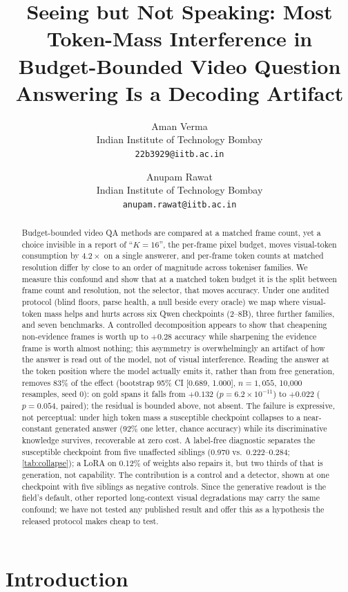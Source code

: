 \documentclass[10pt,twocolumn,letterpaper]{article}
\title{Seeing but Not Speaking: Most Token-Mass Interference in Budget-Bounded Video Question Answering Is a Decoding Artifact}
\author{Aman Verma\\
Indian Institute of Technology Bombay\\
{\tt\small 22b3929@iitb.ac.in}
\and
Anupam Rawat\\
Indian Institute of Technology Bombay\\
{\tt\small anupam.rawat@iitb.ac.in}}
\begin{document}
\maketitle

\begin{abstract}
Budget-bounded video QA methods are compared at a matched frame count, yet a choice invisible in a report of ``$K{=}16$'', the per-frame pixel budget, moves visual-token consumption by $4.2\times$ on a single answerer, and per-frame token counts at matched resolution differ by close to an order of magnitude across tokeniser families. We measure this confound and show that at a matched token budget it is the split between frame count and resolution, not the selector, that moves accuracy. Under one audited protocol (blind floors, parse health, a null beside every oracle) we map where visual-token mass helps and hurts across six Qwen checkpoints (2--8B), three further families, and seven benchmarks. A controlled decomposition appears to show that cheapening non-evidence frames is worth up to $+0.28$ accuracy while sharpening the evidence frame is worth almost nothing; this asymmetry is overwhelmingly an artifact of how the answer is read out of the model, not of visual interference. Reading the answer at the token position where the model actually emits it, rather than from free generation, removes 83\% of the effect (bootstrap 95\% CI [0.689, 1.000], $n{=}1{,}055$, 10{,}000 resamples, seed 0): on gold spans it falls from $+0.132$ ($p{=}6.2{\times}10^{-11}$) to $+0.022$ ($p{=}0.054$, paired); the residual is bounded above, not absent. The failure is expressive, not perceptual: under high token mass a susceptible checkpoint collapses to a near-constant generated answer (92\% one letter, chance accuracy) while its discriminative knowledge survives, recoverable at zero cost. A label-free diagnostic separates the susceptible checkpoint from five unaffected siblings (0.970 vs.\ 0.222--0.284; \cref{tab:collapse}); a LoRA on 0.12\% of weights also repairs it, but two thirds of that is generation, not capability. The contribution is a control and a detector, shown at one checkpoint with five siblings as negative controls. Since the generative readout is the field's default, other reported long-context visual degradations may carry the same confound; we have not tested any published result and offer this as a hypothesis the released protocol makes cheap to test.
\end{abstract}

\section{Introduction}
\label{sec:intro}
\end{document}
